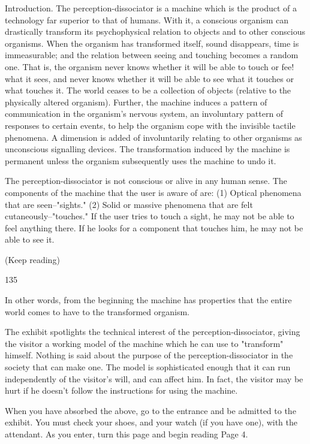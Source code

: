 \documentclass[10pt,twoside]{memoir}
\begin{document}
\begin{enumerate}
{\begin{enumerate}
\begin{sysrules}
\begin{sysrules}
\begin{sysrules}
\begin{sysrules}
{\begin{enumerate}
{{{{Introduction. The perception-dissociator is a machine which is the 
product of a technology far superior to that of humans. With it, a conscious 
organism can drastically transform its psychophysical relation to objects and 
to other conscious organisms. When the organism has transformed itself, 
sound disappears, time is immeasurable; and the relation between seeing and 
touching becomes a random one. That is, the organism never knows whether 
it will be able to touch or fee! what it sees, and never knows whether it will 
be able to see what it touches or what touches it. The world ceases to be a 
collection of objects (relative to the physically altered organism). Further, 
the machine induces a pattern of communication in the organism's nervous 
system, an involuntary pattern of responses to certain events, to help the 
organism cope with the invisible tactile phenomena. A dimension is added of 
involuntarily relating to other organisms as unconscious signalling devices. 
The transformation induced by the machine is permanent unless the 
organism subsequently uses the machine to undo it. 


The perception-dissociator is not conscious or alive in any human sense. 
The components of the machine that the user is aware of are: (1) Optical 
phenomena that are seen--"sights." (2) Solid or massive phenomena that are 
felt cutaneously--"touches." If the user tries to touch a sight, he may not be 
able to feel anything there. If he looks for a component that touches him, he 
may not be able to see it. 


(Keep reading) 


135 


In other words, from the beginning the machine has properties that the 
entire world comes to have to the transformed organism. 


The exhibit spotlights the technical interest of the 
perception-dissociator, giving the visitor a working model of the machine 
which he can use to "transform" himself. Nothing is said about the purpose 
of the perception-dissociator in the society that can make one. The model is 
sophisticated enough that it can run independently of the visitor's will, and 
can affect him. In fact, the visitor may be hurt if he doesn't follow the 
instructions for using the machine. 


When you have absorbed the above, go to the entrance and be admitted 
to the exhibit. You must check your shoes, and your watch (if you have 
one), with the attendant. As you enter, turn this page and begin reading Page 
4. 


}}}}
\end{enumerate}}
\end{sysrules}
\end{sysrules}
\end{sysrules}
\end{sysrules}
\end{enumerate}}
\end{enumerate}
\end{document}
